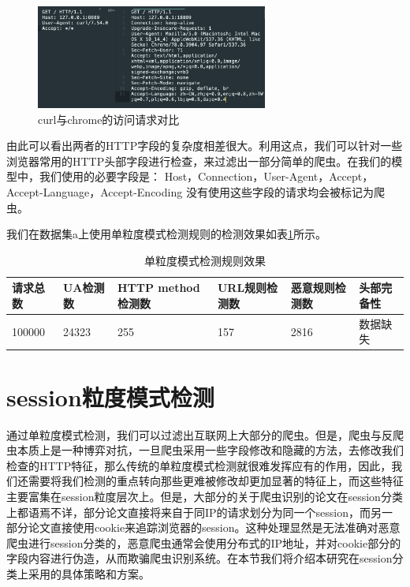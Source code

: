 \documentclass[doctor,privacy,twoside]{buaa_mac}
\begin{document}
\centerline{}
\begin{figure}[!h]
  \centering
  \includegraphics[width=0.68\textwidth]{images/http_request_contrast.png}
  \caption{curl与chrome的访问请求对比}
  \label{fig:curl}
\end{figure}
\centerline{}

由此可以看出两者的HTTP字段的复杂度相差很大。利用这点，我们可以针对一些浏览器常用的HTTP头部字段进行检查，来过滤出一部分简单的爬虫。在我们的模型中，我们使用的必要字段是：
Host，Connection，User-Agent，Accept，Accept-Language，Accept-Encoding
没有使用这些字段的请求均会被标记为爬虫。

我们在数据集a上使用单粒度模式检测规则的检测效果如表\ref{tab:single-effect}所示。

\centerline{}
\begin{table}[h]
  \caption{单粒度模式检测规则效果}
  \label{tab:single-effect}
  \centering
\begin{tabular}{|p{2cm}<{\centering}|p{2cm}<{\centering}|p{3cm}<{\centering}|p{2cm}<{\centering}|p{3cm}<{\centering}|p{2cm}<{\centering}|}
    \hline
   请求总数 & UA检测数  & HTTP method检测数 & URL规则检测数 &  恶意规则检测数  & 头部完备性  \\
    \hline
 100000  &  24323     &     255       &        157      &   2816 & 数据缺失 \\

\hline
    \end{tabular}
\end{table}
\centerline{}


\section{session粒度模式检测}
通过单粒度模式检测，我们可以过滤出互联网上大部分的爬虫。但是，爬虫与反爬虫本质上是一种博弈对抗，一旦爬虫采用一些字段修改和隐藏的方法，去修改我们检查的HTTP特征，那么传统的单粒度模式检测就很难发挥应有的作用，因此，我们还需要将我们检测的重点转向那些更难被修改却更加显著的特征上，而这些特征主要富集在session粒度层次上。但是，大部分的关于爬虫识别的论文在session分类上都语焉不详，部分论文直接将来自于同IP的请求划分为同一个session，而另一部分论文直接使用cookie来追踪浏览器的session。这种处理显然是无法准确对恶意爬虫进行session分类的，恶意爬虫通常会使用分布式的IP地址，并对cookie部分的字段内容进行伪造，从而欺骗爬虫识别系统。在本节我们将介绍本研究在session分类上采用的具体策略和方案。
\end{document}
